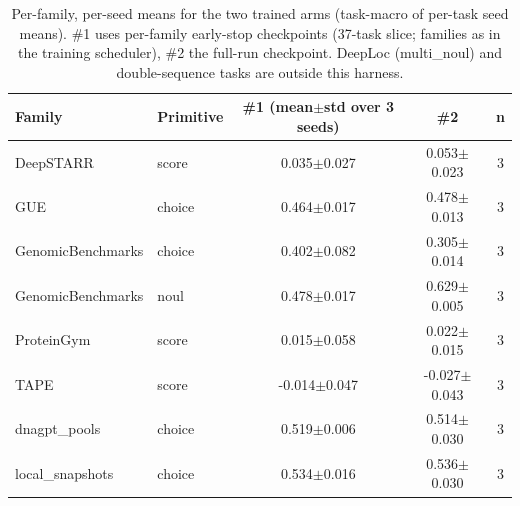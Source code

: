 \begin{table}[t]
\centering
\caption{Per-family, per-seed means for the two trained arms (task-macro of per-task seed means). \#1 uses per-family early-stop checkpoints (37-task slice; families as in the training scheduler), \#2 the full-run checkpoint. DeepLoc (multi\_noul) and double-sequence tasks are outside this harness.}
\label{tab:appendix}
\footnotesize
\begin{tabular}{llccc}
\toprule
Family & Primitive & \#1 (mean$\pm$std over 3 seeds) & \#2 & n \\ \midrule
DeepSTARR & score & 0.035$\pm$0.027 & 0.053$\pm$0.023 & 3 \\
GUE & choice & 0.464$\pm$0.017 & 0.478$\pm$0.013 & 3 \\
GenomicBenchmarks & choice & 0.402$\pm$0.082 & 0.305$\pm$0.014 & 3 \\
GenomicBenchmarks & noul & 0.478$\pm$0.017 & 0.629$\pm$0.005 & 3 \\
ProteinGym & score & 0.015$\pm$0.058 & 0.022$\pm$0.015 & 3 \\
TAPE & score & -0.014$\pm$0.047 & -0.027$\pm$0.043 & 3 \\
dnagpt\_pools & choice & 0.519$\pm$0.006 & 0.514$\pm$0.030 & 3 \\
local\_snapshots & choice & 0.534$\pm$0.016 & 0.536$\pm$0.030 & 3 \\
\bottomrule
\end{tabular}
\end{table}
